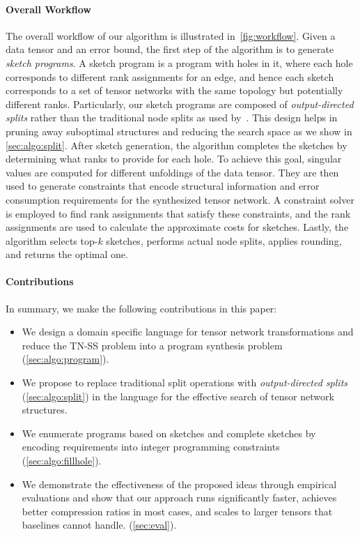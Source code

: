 \paragraph{Overall Workflow}
%
The overall workflow of our algorithm is illustrated in~\cref{fig:workflow}.
%
Given a data tensor and an error bound, the first step of the algorithm is to generate \emph{sketch programs}.
%
A sketch program is a program with holes in it, where each hole corresponds to different rank assignments for an edge, and hence each sketch corresponds to a set of tensor networks with the same topology but potentially different ranks.
%
Particularly, our sketch programs are composed of \emph{output-directed splits} rather than the traditional node splits as used by~\citet{handschuh2015numerical}.
%
This design helps in pruning away suboptimal structures and reducing the search space as we show in \cref{sec:algo:split}.
%
After sketch generation, the algorithm completes the sketches by determining what ranks to provide for each hole.
%
To achieve this goal, singular values are computed for different unfoldings of the data tensor.
%
They are then used to generate constraints that encode structural information and error consumption requirements for the synthesized tensor network.
%
A constraint solver is employed to find rank assignments that satisfy these constraints, and the rank assignments are used to calculate the approximate costs for sketches.
%
Lastly, the algorithm selects top-$k$ sketches, performs actual node splits, applies rounding, and returns the optimal one.

\paragraph{Contributions}
%
In summary, we make the following contributions in this paper:
%
\begin{itemize}[parsep=-.5ex]
    \item We design a domain specific language for tensor network transformations and reduce the TN-SS problem into a program synthesis problem (\cref{sec:algo:program}).
    \item We propose to replace traditional split operations with \emph{output-directed splits} (\cref{sec:algo:split}) in the language for the effective search of tensor network structures.
    \item We enumerate programs based on sketches and complete sketches by encoding requirements into integer programming constraints (\cref{sec:algo:fillhole}).
    \item We demonstrate the effectiveness of the proposed ideas through empirical evaluations and show that our approach runs significantly faster, achieves better compression ratios in most cases, and scales to larger tensors that baselines cannot handle. (\cref{sec:eval}).
\end{itemize}
